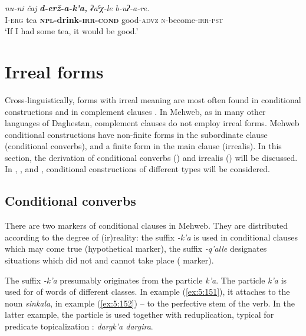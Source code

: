 ﻿\documentclass[output=paper]{langsci/langscibook}
\begin{document}
\ex %
\gll \emph{nu-ni} \emph{čaj} \emph{\textbf{d-erž-a-k'a,}} \emph{ʡaˤχ-le} \emph{b-uʔ-a-re.}\\
 I-\textsc{erg} tea \textbf{\textsc{npl}-drink-\textsc{irr}-\textsc{cond}} good-\textsc{advz} \textsc{n}-become-\textsc{irr}-\textsc{pst}\\
\glt `If I had some tea, it would be good.'
\z


\removelastskip
{}

\section{Irreal forms}\label{irreal-forms}


Cross-linguistically, forms with irreal meaning are most often found in
conditional constructions and in complement clauses \citep{mauri-sanso2016}.
In Mehweb, as in many other languages of Daghestan, complement clauses
do not employ irreal forms. Mehweb conditional constructions have
non-finite forms in the subordinate clause (conditional converbs), and a
finite form in the main clause (irrealis). In this section, the derivation
of conditional converbs () and irrealis () will be discussed. In
, , and , conditional constructions of different types
will be considered.

\subsection{Conditional converbs}\label{conditional-converbs}


There are two markers of conditional clauses in Mehweb. They are
distributed according to the degree of (ir)reality: the suffix
\emph{-k'a} is used in conditional clauses which may come true
(hypothetical marker), the suffix \emph{-q'alle} designates situations
which did not and cannot take place ( marker).

The suffix \emph{-k'a} presumably originates from the particle \emph{k'a}.
The particle \emph{k'a} is used for  of words of different
classes. In example (\ref{ex:5:151}), it attaches to the noun \emph{sinkala}, in
example (\ref{ex:5:152}) – to the perfective stem of the verb. In the latter
example, the particle is used together with reduplication, typical for
predicate topicalization \citep{maisak2010}: \emph{dargk'a dargira}.
\end{document}
